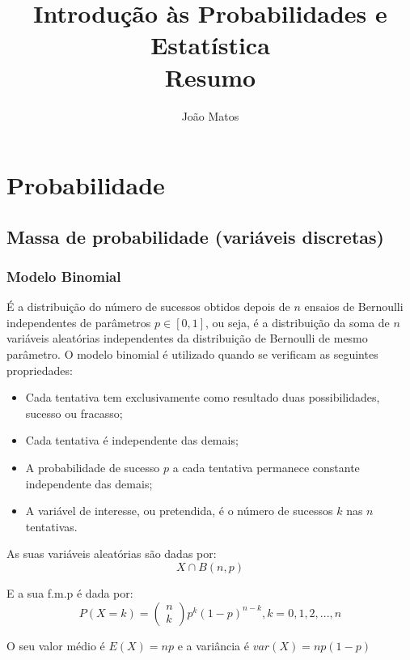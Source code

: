 \documentclass[10pt,a4paper]{report}
\title{\Huge{Introduç\~ao às Probabilidades e Estatística} \\ \vspace{1cm}
       \huge{Resumo}}
\author{\large {Jo\~ao Matos}}
\date{}
\begin{document}
\maketitle

\chapter{Probabilidade}

\section{Massa de probabilidade (variáveis discretas)}

\subsection{Modelo Binomial}
É a distribuição do número de sucessos obtidos depois de $n$ ensaios de Bernoulli independentes de parâmetros $p\in [0,1]$, ou seja, é a distribuição da soma de $n$ variáveis aleatórias independentes da distribuição de Bernoulli de mesmo parâmetro.
O modelo binomial é utilizado quando se verificam as seguintes propriedades:
\begin{itemize}
\item Cada tentativa tem exclusivamente como resultado duas possibilidades, sucesso ou fracasso;
\item Cada tentativa é independente das demais;
\item A probabilidade de sucesso $p$ a cada tentativa permanece constante independente das demais;
\item A variável de interesse, ou pretendida, é o número de sucessos $k$ nas $n$ tentativas.
\end{itemize}

As suas variáveis aleatórias s\~ao dadas por:\\

$$
X \cap B(n, p)
$$

E a sua f.m.p é dada por:\\

$$
P(X = k) = \begin{pmatrix}
n \\
k
\end{pmatrix} p^k(1-p)^{n-k}, k = 0, 1, 2, ..., n
$$

\vspace{0.7cm}

O seu valor médio é $E(X)=np$ e a variância é $var(X)=np(1-p)$
\end{document}
